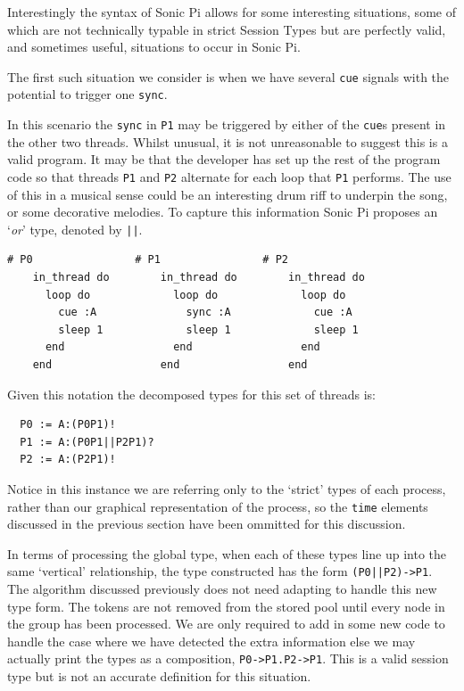 \documentclass[11pt, abstracton, twoside]{scrartcl}
\begin{document}
Interestingly the syntax of Sonic Pi allows for some interesting situations,
some of which are not technically typable in strict Session Types but are
perfectly valid, and sometimes useful, situations to occur in Sonic Pi.

The first such situation we consider is when we have several \texttt{cue}
signals with the potential to trigger one \texttt{sync}.



In this scenario the \texttt{sync} in \texttt{P1} may be triggered by either
of the \texttt{cue}s present in the other two threads. Whilst unusual,
it is not unreasonable to suggest this is a valid program. It may be that the
developer has set up the rest of the program code so that threads \texttt{P1} 
and \texttt{P2} alternate for each loop that \texttt{P1} performs. The use
of this in a musical sense could be an interesting drum riff to underpin the
song, or some decorative melodies. To capture this information Sonic Pi 
proposes an `\emph{or}' type, denoted by \texttt{||}. 


\begin{minipage}{\textwidth}
	\begin{lstlisting}[style = sonicpi]
    # P0                # P1                # P2
    in_thread do        in_thread do        in_thread do
      loop do             loop do             loop do
        cue :A              sync :A             cue :A
        sleep 1             sleep 1             sleep 1
      end                 end                 end
    end                 end                 end
	\end{lstlisting}
\end{minipage}


Given this notation the
decomposed types for this set of threads is:
\\
\begin{lstlisting}
  P0 := A:(P0P1)!
  P1 := A:(P0P1||P2P1)?
  P2 := A:(P2P1)!
\end{lstlisting}

Notice in this instance we are referring only to the `strict' types of each 
process, rather than our graphical representation of the process, so the
\texttt{time} elements discussed in the previous section have been ommitted 
for this discussion.



In terms of processing the global type, when each of these types line up
into the same `vertical' relationship, the type constructed has the form 
\texttt{(P0||P2)->P1}. The algorithm discussed previously does not need
adapting to handle this new type form. The tokens are not removed from the
stored pool until every node in the group has been processed. We are only
required to add in some new code to handle the case where we have detected
the extra information else we may actually print the types as a composition,
\texttt{P0->P1.P2->P1}. This is a valid session type but is not an accurate
definition for this situation.
\end{document}
